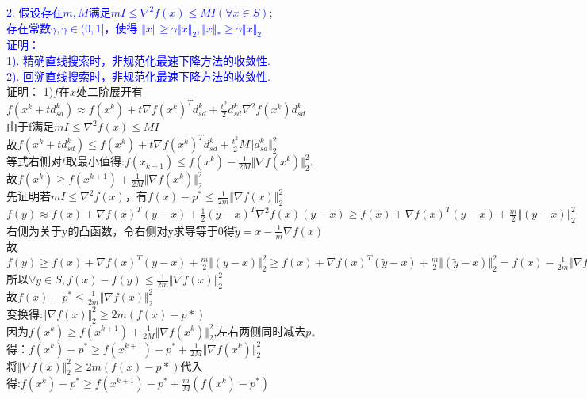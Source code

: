 \documentclass{article}
\begin{document}
\textcolor{blue}{2. 假设存在$m,M$满足$mI \leq \nabla^2 f(x) \leq MI (\forall x \in S)$;\\
存在常数$\gamma,\tilde{\gamma} \in (0,1]$，使得 $\Vert x \Vert \geq \gamma \Vert x \Vert_2, \Vert x \Vert_* \geq \tilde{\gamma}\Vert x \Vert_2$ \\
证明：\\
1). 精确直线搜索时，非规范化最速下降方法的收敛性.\\ 
2). 回溯直线搜索时，非规范化最速下降方法的收敛性.}\\
证明：
1)$f$在$x$处二阶展开有 $f(x^k+td^k_{sd}) \approx f(x^k) + t \nabla f(x^k)^T d^k_{sd} + \frac{t^2}{2}d^k_{sd}\nabla^2 f(x^k)d^k_{sd}$\\
由于f满足$ mI \leq \nabla^2 f(x) \leq MI$\\
故$f(x^k+td^k_{sd}) \leq f(x^k) + t \nabla f(x^k)^T d^k_{sd} + \frac{t^2}{2}M\Vert d^k_{sd} \Vert_2^2$\\
等式右侧对$t$取最小值得:$f(x_{k+1}) \leq f(x^k) - \frac{1}{2M}\Vert \nabla f(x^k)\Vert ^2_2$.\\
故$f(x^k)  \geq  f(x^{k+1}) + \frac{1}{2M}\Vert \nabla f(x^k)\Vert ^2_2$\\
先证明若$mI \leq \nabla^2 f(x)$，有$f(x) - p^* \leq \frac{1}{2m}\Vert \nabla f(x)\Vert^2_2$\\
$f(y) \approx f(x) + \nabla f(x)^T (y-x) + \frac{1}{2}(y-x)^T \nabla^2 f(x) (y-x) \geq f(x) + \nabla f(x)^T (y-x) + \frac{m}{2} \Vert (y-x)\Vert_2^2$\\
右侧为关于y的凸函数，令右侧对y求导等于0得$\tilde{y} = x - \frac{1}{m}\nabla f(x)$\\
故$f(y) \geq f(x) + \nabla f(x)^T (y-x) + \frac{m}{2} \Vert (y-x)\Vert_2^2 \geq f(x) + \nabla f(x)^T (\tilde{y}-x) + \frac{m}{2} \Vert (\tilde{y}-x)\Vert_2^2 = f(x) - \frac{1}{2m}\Vert \nabla f(x)\Vert^2_2$\\
所以$\forall y \in S, f(x) - f(y) \leq \frac{1}{2m} \Vert \nabla f(x)\Vert^2_2$\\
故$f(x) - p^* \leq \frac{1}{2m} \Vert \nabla f(x)\Vert^2_2$\\
变换得:$\Vert \nabla f(x)\Vert^2_2 \geq 2m(f(x) - p*)$\\
因为$f(x^k)  \geq  f(x^{k+1}) + \frac{1}{2M}\Vert \nabla f(x^k)\Vert ^2_2$,左右两侧同时减去$p_*$\\
得：$f(x^k) -p^* \geq  f(x^{k+1}) - p^* + \frac{1}{2M}\Vert \nabla f(x^k)\Vert ^2_2$\\
将$\Vert \nabla f(x)\Vert^2_2 \geq 2m(f(x) - p*)$代入\\
得:$f(x^k) -p^* \geq  f(x^{k+1}) - p^* + \frac{m}{M}(f(x^k) - p^*)$\\
\end{document}
